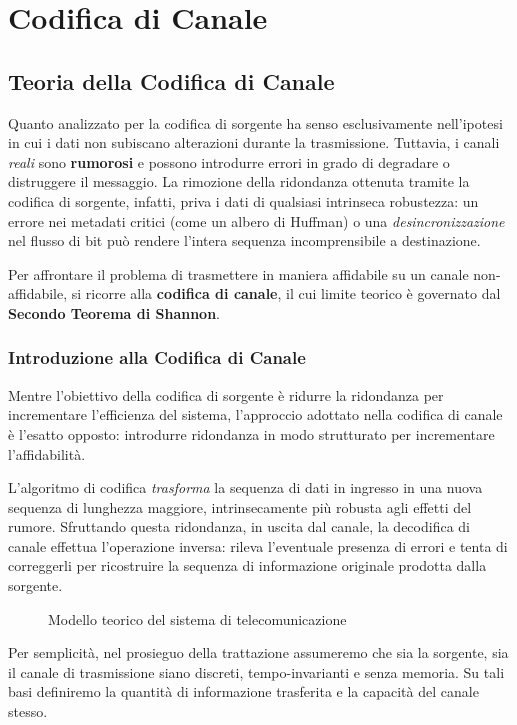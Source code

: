 \part{Codifica di Canale}

\chapter{Teoria della Codifica di Canale}
Quanto analizzato per la codifica di sorgente ha senso esclusivamente nell'ipotesi in cui i dati non subiscano alterazioni durante la trasmissione. Tuttavia, i canali \textit{reali} sono \textbf{rumorosi} e possono introdurre errori in grado di degradare o distruggere il messaggio. La rimozione della ridondanza ottenuta tramite la codifica di sorgente, infatti, priva i dati di qualsiasi intrinseca robustezza: un errore nei metadati critici (come un albero di Huffman) o una \textit{desincronizzazione} nel flusso di bit può rendere l'intera sequenza incomprensibile a destinazione.

Per affrontare il problema di trasmettere in maniera affidabile su un canale non-affidabile, si ricorre alla \textbf{codifica di canale}, il cui limite teorico è governato dal \textbf{Secondo Teorema di Shannon}.

\section{Introduzione alla Codifica di Canale}
Mentre l'obiettivo della codifica di sorgente è ridurre la ridondanza per incrementare l'efficienza del sistema, l'approccio adottato nella codifica di canale è l'esatto opposto: introdurre ridondanza in modo strutturato per incrementare l'affidabilità.

L'algoritmo di codifica \textit{trasforma} la sequenza di dati in ingresso in una nuova sequenza di lunghezza maggiore, intrinsecamente più robusta agli effetti del rumore. Sfruttando questa ridondanza, in uscita dal canale, la decodifica di canale effettua l'operazione inversa: rileva l'eventuale presenza di errori e tenta di correggerli per ricostruire la sequenza di informazione originale prodotta dalla sorgente.

\begin{figure}[h]
    \centering
    
    \caption{Modello teorico del sistema di telecomunicazione}
    \label{fig:Modello teorico}
\end{figure}

Per semplicità, nel prosieguo della trattazione assumeremo che sia la sorgente, sia il canale di trasmissione siano discreti, tempo-invarianti e senza memoria. Su tali basi definiremo la quantità di informazione trasferita e la capacità del canale stesso.

